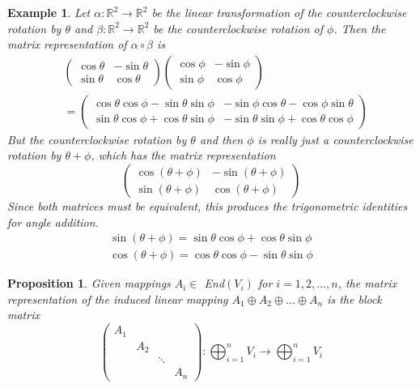 \documentclass{article}
\newtheorem{proposition}[theorem]{Proposition}
\newtheorem{example}{Example}[section]
\theoremstyle{remark}
\theoremstyle{definition}
\begin{document}
    \begin{example}
    Let $\alpha: \mathbb{R}^2 \longrightarrow \mathbb{R}^2$ be the linear transformation of the counterclockwise rotation by $\theta$ and $\beta: \mathbb{R}^2 \longrightarrow \mathbb{R}^2$ be the counterclockwise rotation of $\phi$. Then the matrix representation of $\alpha \circ \beta$ is 
    \begin{align*}
        & \begin{pmatrix}
    \cos{\theta} & - \sin{\theta} \\
    \sin{\theta} & \cos{\theta}
    \end{pmatrix} \begin{pmatrix}
    \cos{\phi} & - \sin{\phi} \\
    \sin{\phi} & \cos{\phi} 
    \end{pmatrix} \\
     & = \begin{pmatrix}
    \cos{\theta} \cos{\phi} - \sin{\theta} \sin{\phi} & - \sin{\phi} \cos{\theta} - \cos{\phi} \sin{\theta} \\
    \sin{\theta} \cos{\phi} + \cos{\theta} \sin{\phi} & - \sin{\theta} \sin{\phi} + \cos{\theta} \cos{\phi}
    \end{pmatrix}
    \end{align*}
    But the counterclockwise rotation by $\theta$ and then $\phi$ is really just a counterclockwise rotation by $\theta + \phi$, which has the matrix representation
    \[\begin{pmatrix}
    \cos{(\theta + \phi)} & - \sin{(\theta + \phi)} \\
    \sin{(\theta + \phi)} & \cos{(\theta + \phi)}
    \end{pmatrix}\]
    Since both matrices must be equivalent, this produces the trigonometric identities for angle addition.
    \begin{align*}
        \sin{(\theta + \phi)} = \sin{\theta} \cos{\phi} + \cos{\theta} \sin{\phi} \\
        \cos{(\theta + \phi)} = \cos{\theta} \cos{\phi} - \sin{\theta} \sin{\phi}
    \end{align*}
    \end{example}

    \begin{proposition}
    Given mappings $A_i \in$ End$(V_i)$ for $i = 1, 2, ..., n$, the matrix representation of the induced linear mapping $A_1 \oplus A_2 \oplus ... \oplus A_n$ is the block matrix 
    \[\begin{pmatrix}
    A_1 & & & \\
    & A_2 & & \\
    & & \ddots & \\
    & & & A_n
    \end{pmatrix}: \bigoplus_{i=1}^n V_i \longrightarrow \bigoplus_{i=1}^n V_i\]
    \end{proposition}
\end{document}

